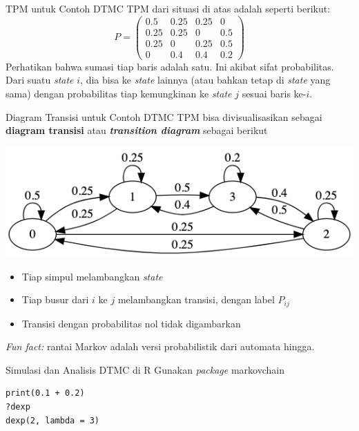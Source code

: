 \documentclass{beamer}
\begin{document}
\begin{frame}{TPM untuk Contoh DTMC}
    TPM dari situasi di atas adalah seperti berikut:
    \[ P = \begin{pmatrix}
        0.5 & 0.25 & 0.25 & 0 \\
        0.25 & 0.25 & 0 & 0.5 \\
        0.25 & 0 & 0.25 & 0.5 \\
        0 & 0.4 & 0.4 & 0.2
    \end{pmatrix} \]
    Perhatikan bahwa sumasi tiap baris adalah satu. Ini akibat sifat probabilitas. Dari suatu \textit{state} \(i\), dia bisa ke \textit{state} lainnya (atau bahkan tetap di \textit{state} yang sama) dengan probabilitas tiap kemungkinan ke \textit{state} \(j\) sesuai baris ke-\(i\).
\end{frame}

\begin{frame}{Diagram Transisi untuk Contoh DTMC}
    TPM bisa divisualisasikan sebagai \textbf{diagram transisi} atau \textbf{\textit{transition diagram}} sebagai berikut

    \includegraphics[scale=0.5]{gambar/contoh_dtmc.png}

    \begin{itemize}
        \item Tiap simpul melambangkan \textit{state}
        \item Tiap busur dari \(i\) ke \(j\) melambangkan transisi, dengan label \(P_{ij}\)
        \item Transisi dengan probabilitas nol tidak digambarkan
    \end{itemize}
    \textit{Fun fact:} rantai Markov adalah versi probabilistik dari automata hingga.
\end{frame}

\begin{frame}[fragile]{Simulasi dan Analisis DTMC di R}
    Gunakan \textit{package} markovchain

\begin{verbatim}
print(0.1 + 0.2)
?dexp
dexp(2, lambda = 3)
\end{verbatim}
\end{frame}
\end{document}
